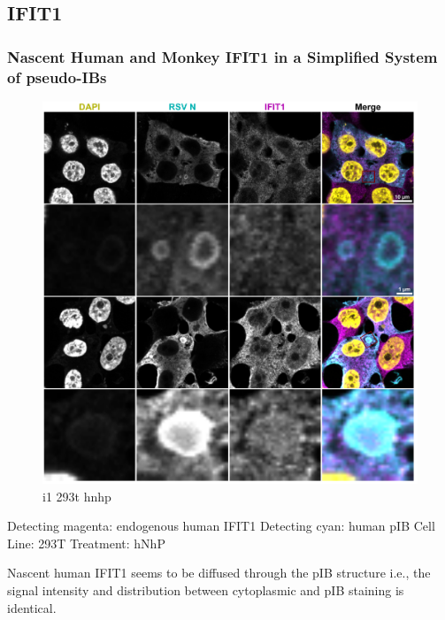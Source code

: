 \subsection{IFIT1} \label{subsec:IFIT1}
\subsubsection{Nascent Human and Monkey IFIT1 in a Simplified System of pseudo-IBs} \label{Nascent Human and Monkey IFIT1 in a Simplified System of pseudo-IBs}

\begin{figure}
    \centering
    \includegraphics[width=1\linewidth]{09. Chapter 4/Figs/03. IFIT1/01. endo_human.pdf}
    \caption[i1 293t hnhp]{i1 293t hnhp}
    \label{fig:i1 293t hnhp}
\end{figure}

Detecting magenta: endogenous human IFIT1 \newline
Detecting cyan: human pIB \newline
Cell Line: 293T \newline
Treatment: hNhP \newline

Nascent human IFIT1 seems to be diffused through the pIB structure i.e., the signal intensity and distribution between cytoplasmic and pIB staining is identical.  

